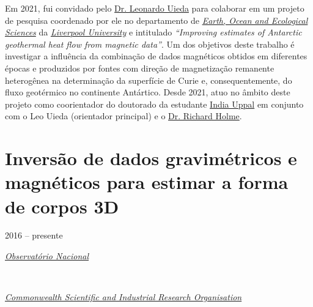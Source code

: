 \bigskip

\noindent Em 2021, fui convidado pelo 
\href{https://www.liverpool.ac.uk/environmental-sciences/staff/leonardo-uieda/}{Dr. Leonardo Uieda} 
para colaborar em um projeto de pesquisa coordenado por ele no departamento de
\href{https://www.liverpool.ac.uk/earth-ocean-and-ecological-sciences/}{\textit{Earth, Ocean and Ecological Sciences}} da 
\href{https://www.liverpool.ac.uk/}{\textit{Liverpool University}} e 
intitulado 
\textit{``Improving estimates of Antarctic geothermal heat flow from magnetic data''}. 
Um dos objetivos deste trabalho é investigar a influência da combinação de dados
magnéticos obtidos em diferentes épocas e produzidos por fontes com direção de magnetização
remanente heterogênea na determinação da superfície de Curie e, consequentemente, do
fluxo geotérmico no continente Antártico.
Desde 2021, atuo no âmbito deste projeto como 
coorientador do doutorado da estudante  
\href{https://orcid.org/0000-0003-3531-2656}{India Uppal} em conjunto com o Leo Uieda
(orientador principal) e o 
\href{https://www.liverpool.ac.uk/environmental-sciences/staff/richard-holme/}{Dr. Richard Holme}.

\clearpage

\section{Inversão de dados gravimétricos e magnéticos para estimar a forma de corpos 3D} 
\label{sec:projeto-bolachinhas}

2016 -- presente
\vspace{0.3\baselineskip}\\
\noindent\parbox{0.03\textwidth}{\vspace{-0.2\baselineskip}\faUniversity} \href{https://www.gov.br/observatorio/pt-br}{\textsl{Observatório Nacional}}
\parbox{0.03\textwidth}{\vspace{-0.2\baselineskip} \hfill {}} \\
\noindent\parbox{0.03\textwidth}{\vspace{-0.2\baselineskip}\faUniversity}
\href{https://www.csiro.au/}{\textsl{Commonwealth Scientific and Industrial Research Organisation}}
\parbox{0.04\textwidth}{\vspace{-0.2\baselineskip} \hfill {}}

